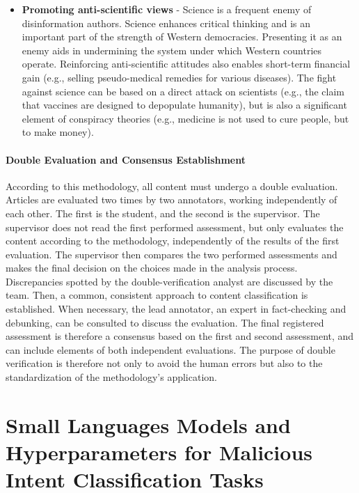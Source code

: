 \documentclass[11pt]{article}
\begin{document}
\begin{itemize}[nosep, leftmargin=*]
    \item \textbf{Promoting anti-scientific views} - Science is a frequent enemy of disinformation authors. Science enhances critical thinking and is an important part of the strength of Western democracies. Presenting it as an enemy aids in undermining the system under which Western countries operate. Reinforcing anti-scientific attitudes also enables short-term financial gain (e.g., selling pseudo-medical remedies for various diseases). The fight against science can be based on a direct attack on scientists (e.g., the claim that vaccines are designed to depopulate humanity), but is also a significant element of conspiracy theories (e.g., medicine is not used to cure people, but to make money).
\end{itemize}

\paragraph{Double Evaluation and Consensus Establishment}

According to this methodology, all content must undergo a double evaluation. Articles are evaluated two times by two annotators, working independently of each other. The first is the student, and the second is the supervisor. The supervisor does not read the first performed assessment, but only evaluates the content according to the methodology, independently of the results of the first evaluation. The supervisor then compares the two performed assessments and makes the final decision on the choices made in the analysis process. Discrepancies spotted by the double-verification analyst are discussed by the team. Then, a common, consistent approach to content classification is established. When necessary, the lead annotator, an expert in fact-checking and debunking, can be consulted to discuss the evaluation. The final registered assessment is therefore a consensus based on the first and second assessment, and can include elements of both independent evaluations. The purpose of double verification is therefore not only to avoid the human errors but also to the standardization of the methodology's application.



\section{Small Languages Models and Hyperparameters for Malicious Intent Classification Tasks}
\label{appendix:exp_benchmark_setup}
\end{document}
